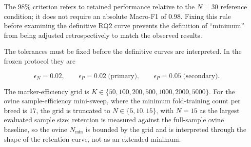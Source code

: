 The $98\%$ criterion refers to retained performance relative to the
$N=30$ reference condition; it does not require an absolute Macro-F1
of $0.98$. Fixing this rule before examining the definitive RQ2 curve
prevents the definition of ``minimum'' from being adjusted
retrospectively to match the observed results.

The tolerances must be fixed before the definitive curves are
interpreted. In the frozen protocol they are

\begin{equation}
    \epsilon_N = 0.02,
    \qquad
    \epsilon_P = 0.02 \;\text{(primary)},
    \qquad
    \epsilon_P = 0.05 \;\text{(secondary)}.
    \label{eq:frozen_tolerances}
\end{equation}

The marker-efficiency grid is
$K\in\{50,100,200,500,1000,2000,5000\}$. For the ovine
sample-efficiency mini-sweep, where the minimum fold-training count per
breed is $17$, the grid is truncated to $N\in\{5,10,15\}$, with $N=15$
as the largest evaluated sample size; retention is measured against
the full-sample ovine baseline, so the ovine $N_{\min}$ is bounded by
the grid and is interpreted through the shape of the retention curve,
not as an extended minimum.
